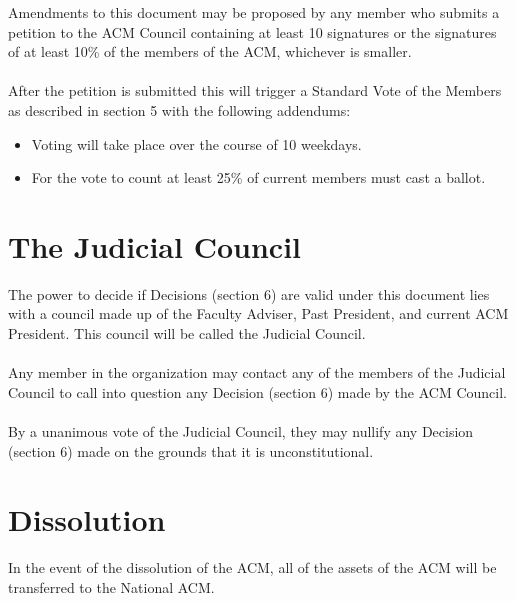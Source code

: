 \documentclass[12pt,titlepage]{article}
\begin{document}
Amendments to this document may be proposed by any member who submits a petition to the ACM Council containing at least 10 signatures or the signatures of at least 10\% of the members of the ACM, whichever is smaller.\\
\\
After the petition is submitted this will trigger a Standard Vote of the Members as described in section 5 with the following addendums:
\begin{itemize}
	\item Voting will take place over the course of 10 weekdays.
	\item For the vote to count at least 25\% of current members must cast a ballot.
\end{itemize}

\section{The Judicial Council}

The power to decide if Decisions (section 6) are valid under this document lies with a council made up of the Faculty Adviser, Past President, and current ACM President. This council will be called the Judicial Council.\\
\\
Any member in the organization may contact any of the members of the Judicial Council to call into question any Decision (section 6) made by the ACM Council.\\
\\
By a unanimous vote of the Judicial Council, they may nullify any Decision (section 6) made on the grounds that it is unconstitutional.

\section{Dissolution}

In the event of the dissolution of the ACM, all of the assets of the ACM will be transferred to the National ACM.
\end{document}
